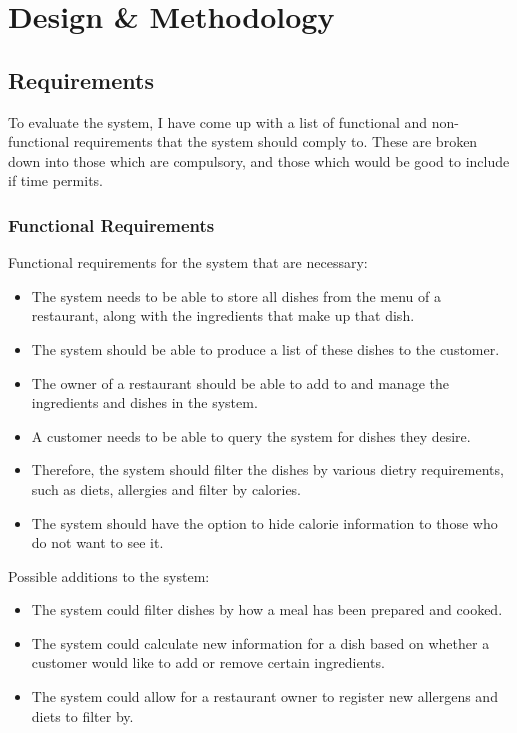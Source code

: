 \chapter{Design \& Methodology}

\section{Requirements}

To evaluate the system, I have come up with a list of functional and non-functional requirements that the system should comply to. These are broken down into those which are compulsory, and those which would be good to include if time permits.

\subsection{Functional Requirements}

Functional requirements for the system that are necessary:

\begin{itemize}
\item The system needs to be able to store all dishes from the menu of a restaurant, along with the ingredients that make up that dish.
\item The system should be able to produce a list of these dishes to the customer.
\item The owner of a restaurant should be able to add to and manage the ingredients and dishes in the system.
\item A customer needs to be able to query the system for dishes they desire.
\item Therefore, the system should filter the dishes by various dietry requirements, such as diets, allergies and filter by calories.
\item The system should have the option to hide calorie information to those who do not want to see it.
\end{itemize}

Possible additions to the system:

\begin{itemize}
\item The system could filter dishes by how a meal has been prepared and cooked.
\item The system could calculate new information for a dish based on whether a customer would like to add or remove certain ingredients.
\item The system could allow for a restaurant owner to register new allergens and diets to filter by.
\end{itemize}

